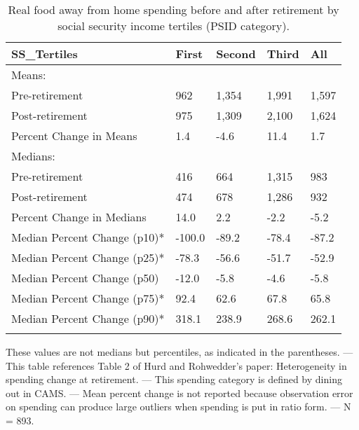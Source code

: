 \begin{table}[tbp] \centering
{}

\caption{Real food away from home spending before and after retirement by social security income tertiles (PSID category).}
\begin{tabularx}{\textwidth}{lCCCC}

\toprule
{SS\_Tertiles}&{First}&{Second}&{Third}&{All} \tabularnewline
\midrule\addlinespace[1.5ex]
Means:&&&& \tabularnewline
\midrule Pre-retirement&962&1,354&1,991&1,597 \tabularnewline
Post-retirement&975&1,309&2,100&1,624 \tabularnewline
Percent Change in Means&1.4&-4.6&11.4&1.7 \tabularnewline
\midrule Medians:&&&& \tabularnewline
\midrule Pre-retirement&416&664&1,315&983 \tabularnewline
Post-retirement&474&678&1,286&932 \tabularnewline
Percent Change in Medians&14.0&2.2&-2.2&-5.2 \tabularnewline
Median Percent Change (p10)*&-100.0&-89.2&-78.4&-87.2 \tabularnewline
Median Percent Change (p25)*&-78.3&-56.6&-51.7&-52.9 \tabularnewline
Median Percent Change (p50)&-12.0&-5.8&-4.6&-5.8 \tabularnewline
Median Percent Change (p75)*&92.4&62.6&67.8&65.8 \tabularnewline
Median Percent Change (p90)*&318.1&238.9&268.6&262.1 \tabularnewline
\bottomrule \addlinespace[1.5ex]

\end{tabularx}
\begin{flushleft}
\footnotesize *These values are not medians but percentiles, as indicated in the parentheses. \linebreak --- \linebreak This table references Table 2 of Hurd and Rohwedder's paper: Heterogeneity in spending change at retirement. \linebreak --- \linebreak This spending category is defined by dining out in CAMS. \linebreak --- \linebreak Mean percent change is not reported because observation error on spending can produce large outliers when spending is put in ratio form. \linebreak --- \linebreak N = 893.
\end{flushleft}
\end{table}
